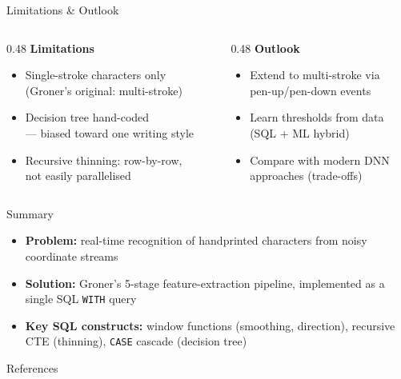 \documentclass[aspectratio=169, 12pt]{beamer}
\begin{document}
\begin{frame}{Limitations \& Outlook}
  \begin{columns}[T]
    \begin{column}{0.48\textwidth}
      \textbf{Limitations}
      \begin{itemize}
        \item Single-stroke characters only\\(Groner's original: multi-stroke)
        \item Decision tree hand-coded\\— biased toward one writing style
        \item Recursive thinning: row-by-row,\\not easily parallelised
      \end{itemize}
    \end{column}
    \begin{column}{0.48\textwidth}
      \textbf{Outlook}
      \begin{itemize}
        \item Extend to multi-stroke via\\pen-up/pen-down events
        \item Learn thresholds from data\\(SQL + ML hybrid)
        \item Compare with modern DNN\\approaches (trade-offs)
      \end{itemize}
    \end{column}
  \end{columns}
\end{frame}

\begin{frame}{Summary}
  \begin{itemize}
    \item \textbf{Problem:} real-time recognition of handprinted characters
          from noisy coordinate streams
    \item \textbf{Solution:} Groner's 5-stage feature-extraction pipeline,
          implemented as a single SQL \texttt{WITH} query
    \item \textbf{Key SQL constructs:} window functions (smoothing, direction),
          recursive CTE (thinning), \texttt{CASE} cascade (decision tree)
  \end{itemize}

\end{frame}

\begin{frame}[allowframebreaks]{References}
  \printbibliography[heading=none]
\end{frame}
\end{document}
